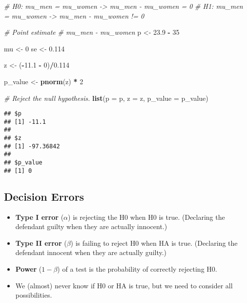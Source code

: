 \documentclass[]{book}
\newenvironment{Shaded}{\begin{snugshade}}{\end{snugshade}}
\newcommand{\CommentTok}[1]{\textcolor[rgb]{0.56,0.35,0.01}{\textit{#1}}}
\newcommand{\DataTypeTok}[1]{\textcolor[rgb]{0.13,0.29,0.53}{#1}}
\newcommand{\DecValTok}[1]{\textcolor[rgb]{0.00,0.00,0.81}{#1}}
\newcommand{\FloatTok}[1]{\textcolor[rgb]{0.00,0.00,0.81}{#1}}
\newcommand{\KeywordTok}[1]{\textcolor[rgb]{0.13,0.29,0.53}{\textbf{#1}}}
\newcommand{\NormalTok}[1]{#1}
\newcommand{\OperatorTok}[1]{\textcolor[rgb]{0.81,0.36,0.00}{\textbf{#1}}}
\newcommand{\StringTok}[1]{\textcolor[rgb]{0.31,0.60,0.02}{#1}}
\begin{document}
\begin{Shaded}
\begin{Highlighting}[]
\CommentTok{# H0: mu_men = mu_women -> mu_men - mu_women = 0}
\CommentTok{# H1: mu_men = mu_women -> mu_men - mu_women != 0}

\CommentTok{# Point estimate}
\CommentTok{# mu_men - mu_women}
\NormalTok{p <-}\StringTok{ }\FloatTok{23.9} \OperatorTok{-}\StringTok{ }\DecValTok{35}

\NormalTok{mu <-}\StringTok{ }\DecValTok{0}
\NormalTok{se <-}\StringTok{ }\FloatTok{0.114}

\NormalTok{z <-}\StringTok{ }\NormalTok{(}\OperatorTok{-}\FloatTok{11.1} \OperatorTok{-}\StringTok{ }\DecValTok{0}\NormalTok{)}\OperatorTok{/}\FloatTok{0.114}

\NormalTok{p_value <-}\StringTok{ }\KeywordTok{pnorm}\NormalTok{(z) }\OperatorTok{*}\StringTok{ }\DecValTok{2}

\CommentTok{# Reject the null hypothesis.}
\KeywordTok{list}\NormalTok{(}\DataTypeTok{p =}\NormalTok{ p, }\DataTypeTok{z =}\NormalTok{ z, }\DataTypeTok{p_value =}\NormalTok{ p_value)}
\end{Highlighting}
\end{Shaded}

\begin{verbatim}
## $p
## [1] -11.1
## 
## $z
## [1] -97.36842
## 
## $p_value
## [1] 0
\end{verbatim}

\hypertarget{decision-errors}{%
\subsection*{Decision Errors}\label{decision-errors}}

\begin{itemize}
\item
  \textbf{Type I error} (\(\alpha\)) is rejecting the H0 when H0 is true. (Declaring the defendant guilty when they are actually innocent.)
\item
  \textbf{Type II error} (\(\beta\)) is failing to reject H0 when HA is true. (Declaring the defendant innocent when they are actually guilty.)
\item
  \textbf{Power} (\(1 - \beta\)) of a test is the probability of correctly rejecting H0.
\item
  We (almost) never know if H0 or HA is true, but we need to consider all possibilities.
\end{itemize}
\end{document}
